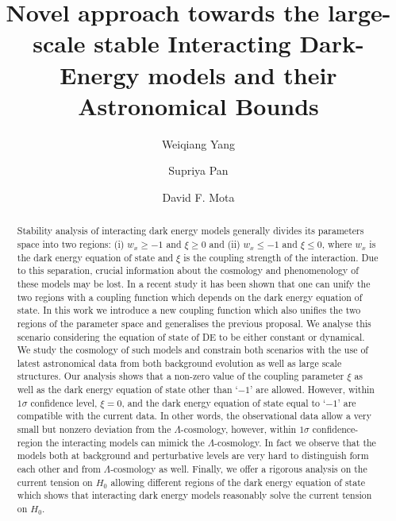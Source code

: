 \documentclass[superscriptaddress,oneolumn,secnumarabic,
amssymb,amsmath,nobibnotes,aps,prd,showpacs,nofootinbib]{revtex4}%
\begin{document}
\title{Novel approach towards the large-scale stable Interacting Dark-Energy models and their Astronomical Bounds}



\author{Weiqiang Yang}


\author{Supriya Pan}


\author{David F. Mota}



\begin{abstract}

Stability analysis of interacting dark energy models generally divides its parameters space into two regions: (i) $w_x \geq -1$ and $\xi \geq 0$ and (ii) $w_x \leq -1$ and $\xi \leq 0$, where $w_x$ is the dark energy equation of state and $\xi$ is the coupling strength of the interaction. Due to this separation, crucial information about the cosmology and phenomenology of these models may be lost.  In a recent study it has been shown that one can unify the two regions with a coupling function which depends on the dark energy equation of state. In this work we introduce a new coupling function which also unifies the two regions of the parameter space and generalises the previous proposal. We analyse this scenario considering the equation of state of DE to be either constant or dynamical. We study the cosmology of such models and constrain both scenarios with the use of latest astronomical data from both background evolution as well as large scale structures. Our analysis shows that a non-zero value of the coupling parameter $\xi$ as well as the dark energy equation of state other than `$-1$' are allowed. However, within $1\sigma$ confidence level, $\xi = 0$, and the dark energy equation of state equal to `$-1$' are compatible with the current data. In other words, the observational data allow a very small but nonzero deviation from the $\Lambda$-cosmology, however, within $1\sigma$ confidence-region the interacting models can mimick the $\Lambda$-cosmology. In fact we observe that the models both at background and perturbative levels are very hard to distinguish form each other and from $\Lambda$-cosmology as well. Finally, we offer a rigorous analysis on the current tension on $H_0$ allowing different regions of the dark energy equation of state which shows that interacting dark energy models reasonably solve the current tension on $H_0$.

\end{abstract}
\end{document}
